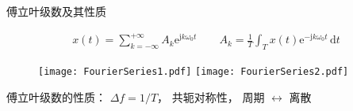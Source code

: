\documentclass[UTF8]{ctexbeamer}
\begin{document}
\begin{frame}{傅立叶级数及其性质}
    \begin{tcolorbox}[top=0mm,
        title = 傅立叶级数（Fourier Series）,
        boxrule = 0.3pt,
        fontupper = \normalcolor\small]
        \begin{gather*}
            x(t) = \sum_{k=-\infty}^{+\infty} A_k \mathrm{e}^{\mathrm{j}k\omega_0t}  
            \qquad
            A_k = \frac{1}{T} \int_T x(t) \mathrm{e}^{-\mathrm{j}k\omega_0t}\,\mathrm{d}t
        \end{gather*}
    \end{tcolorbox}
    
    \begin{figure}
        \centering
        \texttt{[image: FourierSeries1.pdf]}
        \hspace{20pt}
        \texttt{[image: FourierSeries2.pdf]}
    \end{figure}

    傅立叶级数的性质：
    $\Delta f = 1/T$，
    共轭对称性， 
    周期 $\leftrightarrow$ 离散
\end{frame}
\end{document}
